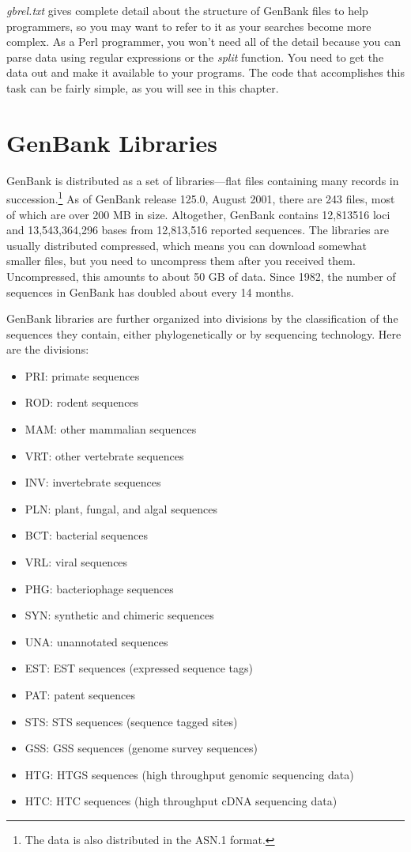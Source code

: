 \textit{gbrel.txt} gives complete detail about the structure of GenBank files to help programmers, so you may want to refer to it as your searches become more complex. As a Perl programmer, you won't need all of the detail because you can parse data using regular expressions or the \textit{split} function. You need to get the data out and make it available to your programs. The code that accomplishes this task can be fairly simple, as you will see in this chapter.

\section{GenBank Libraries}
GenBank is distributed as a set of libraries—flat files containing many records in succession.\footnote{The data is also distributed in the ASN.1 format.} As of GenBank release 125.0, August 2001, there are 243 files, most of which are over 200 MB in size. Altogether, GenBank contains 12,813516 loci and 13,543,364,296 bases from 12,813,516 reported sequences. The libraries are usually distributed compressed, which means you can download somewhat smaller files, but you need to uncompress them after you received them. Uncompressed, this amounts to about 50 GB of data. Since 1982, the number of sequences in GenBank has doubled about every 14 months.

GenBank libraries are further organized into divisions by the classification of the sequences they contain, either phylogenetically or by sequencing technology. Here are the divisions: 

\begin{itemize}
  \item PRI: primate sequences
  \item ROD: rodent sequences
  \item MAM: other mammalian sequences
  \item VRT: other vertebrate sequences
  \item INV: invertebrate sequences
  \item PLN: plant, fungal, and algal sequences
  \item BCT: bacterial sequences
  \item VRL: viral sequences
  \item PHG: bacteriophage sequences
  \item SYN: synthetic and chimeric sequences
  \item UNA: unannotated sequences
  \item EST: EST sequences (expressed sequence tags)
  \item PAT: patent sequences
  \item STS: STS sequences (sequence tagged sites)
  \item GSS: GSS sequences (genome survey sequences)
  \item HTG: HTGS sequences (high throughput genomic sequencing data)
  \item HTC: HTC sequences (high throughput cDNA sequencing data)
\end{itemize}

